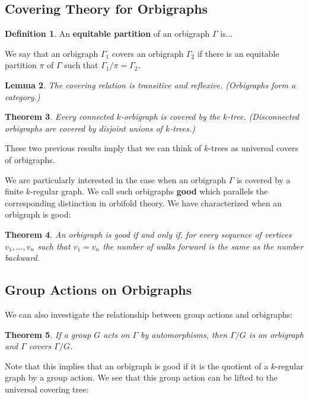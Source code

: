 \documentclass[12pt]{article}
\theoremstyle{plain}
\newtheorem{theorem}{Theorem}
\newtheorem{lemma}[theorem]{Lemma}
\theoremstyle{definition}
\newtheorem{definition}[theorem]{Definition}
\theoremstyle{remark}
\begin{document}
\subsection{Covering Theory for Orbigraphs}

\begin{definition}
An \textbf{equitable partition} of an orbigraph $\Gamma$ is...
\end{definition}

We say that an orbigraph $\Gamma_1$ covers an orbigraph $\Gamma_2$ if there is an equitable partition $\pi$ of $\Gamma$ such that $\Gamma_1 / \pi = \Gamma_2$.

\begin{lemma}
The covering relation is transitive and reflexive. (Orbigraphs form a category.)
\end{lemma}

\begin{theorem}
Every connected $k$-orbigraph is covered by the $k$-tree. (Disconnected orbigraphs are covered by disjoint unions of $k$-trees.)
\end{theorem}

These two previous results imply that we can think of $k$-trees as universal covers of orbigraphs.

We are particularly interested in the case when an orbigraph $\Gamma$ is covered by a finite $k$-regular graph. We call such orbigraphs \textbf{good} which parallels the corresponding distinction in orbifold theory. We have characterized when an orbigraph is good:

\begin{theorem}
An orbigraph is good if and only if, for every sequence of vertices $v_1,\ldots,v_n$ such that $v_1 = v_n$ the number of walks forward is the same as the number backward.
\end{theorem}

\subsection{Group Actions on Orbigraphs}

We can also investigate the relationship between group actions and orbigraphs:

\begin{theorem}
If a group $G$ acts on $\Gamma$ by automorphisms, then $\Gamma / G$ is an orbigraph and $\Gamma$ covers $\Gamma / G$.
\end{theorem}

Note that this implies that an orbigraph is good if it is the quotient of a $k$-regular graph by a group action. We see that this group action can be lifted to the universal covering tree:
\end{document}
